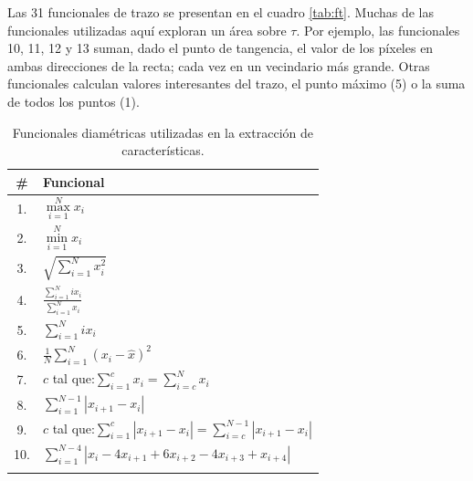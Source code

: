 

Las 31 funcionales de trazo se presentan en el cuadro \ref{tab:ft}.
Muchas de las funcionales utilizadas aquí exploran un área sobre $\tau$. Por ejemplo, las funcionales 10, 11, 12 y 13 suman, dado el punto de tangencia, el valor de los píxeles en ambas direcciones de la recta; cada vez en un vecindario más grande. Otras funcionales calculan valores interesantes del trazo, el punto máximo (5) o la suma de todos los puntos (1).\\


\begin{longtable}{ |c|l| }
        \hline
        \textbf{\#} & \textbf{Funcional} \\
        \hline
        \endhead
1.&$\max \limits_{i=1}^{N}{x_i}$\\ \hline
2.&$\min \limits_{i=1}^{N}{x_i}$\\ \hline
3.&$\sqrt{\sum \limits_{i=1}^{N}{x_i^2}}$ \\ \hline
4.&$\frac{\sum \limits_{i=1}^{N}{ix_i}}{\sum \limits_{i=1}^{N}{x_i}}$ \\ \hline
5.&$\sum \limits_{i=1}^{N}{ix_i}$ \\ \hline
6.&$\frac{1}{N}\sum_{i=1}^{N}{(x_i-\hat{x})^2}$ \\ \hline
7.&$c$ tal que:$\sum \limits_{i=1}^{c}{x_i}=\sum \limits_{i=c}^{N}{x_i}$ \\ \hline
8.&$\sum \limits_{i=1}^{N-1}{|x_{i+1}-x_{i}|}$ \\ \hline
9.&$c$ tal que:$\sum \limits_{i=1}^{c}{|x_{i+1}-x_{i}|}=\sum \limits_{i=c}^{N-1}{|x_{i+1}-x_{i}|}$ \\ \hline
10.&$\sum \limits_{i=1}^{N-4}{|x_{i}-4x_{i+1}+6x_{i+2}-4x_{i+3}+x_{i+4}|}$ \\ \hline
    \caption{Funcionales diamétricas utilizadas en la extracción de características.}
    \label{tab:fd}
\end{longtable}


